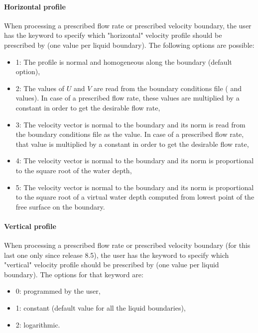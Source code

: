 \paragraph{Horizontal profile}

When processing a prescribed flow rate or prescribed velocity boundary, the
user has the keyword  to specify which "horizontal"
velocity profile should be prescribed by  (one value per liquid
boundary).
The following options are possible:

\begin{itemize}
\item 1: The profile is normal and homogeneous along the boundary (default
option),

\item 2: The values of $U$ and $V$ are read from the boundary
conditions file ( and  values).
In case of a prescribed flow rate, these values are multiplied by a constant
in order to get the desirable flow rate,

\item 3: The velocity vector is normal to the boundary and its norm is read
from the boundary conditions file as the  value. In case of a
prescribed flow rate, that value is multiplied by a constant in order to get
the desirable flow rate,

\item 4: The velocity vector is normal to the boundary and its norm is
proportional to the square root of the water depth,

\item 5: The velocity vector is normal to the boundary and its norm is
proportional to the square root of a virtual water depth computed from lowest
point of the free surface on the boundary.
\end{itemize}

\paragraph{Vertical profile}

When processing a prescribed flow rate or prescribed velocity boundary
(for this last one only since release 8.5), the
user has the keyword  to specify which
"vertical" velocity profile should be prescribed by 
(one value per liquid boundary).
The options for that keyword are:

\begin{itemize}
\item 0: programmed by the user,

\item 1: constant (default value for all the liquid boundaries),

\item 2: logarithmic.
\end{itemize}

